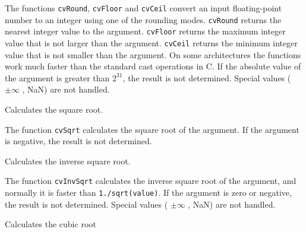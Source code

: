 The functions \texttt{cvRound}, \texttt{cvFloor} and \texttt{cvCeil}
convert an input floating-point number to an integer using one of the rounding
modes. \texttt{cvRound} returns the nearest integer value to the
argument. \texttt{cvFloor} returns the maximum integer value that is not
larger than the argument. \texttt{cvCeil} returns the minimum integer
value that is not smaller than the argument. On some architectures the
functions work much faster than the standard cast
operations in C. If the absolute value of the argument is greater than
$2^{31}$, the result is not determined. Special values ( $ \pm \infty$ , NaN)
are not handled.

\label{Sqrt}

Calculates the square root.


\begin{description}
\end{description}


The function \texttt{cvSqrt} calculates the square root of the argument. If the argument is negative, the result is not determined.

\label{InvSqrt}

Calculates the inverse square root.


\begin{description}
\end{description}


The function \texttt{cvInvSqrt} calculates the inverse square root of the argument, and normally it is faster than \texttt{1./sqrt(value)}. If the argument is zero or negative, the result is not determined. Special values ( $ \pm \infty $ , NaN) are not handled.

\label{Cbrt}

Calculates the cubic root


\begin{description}
\end{description}


